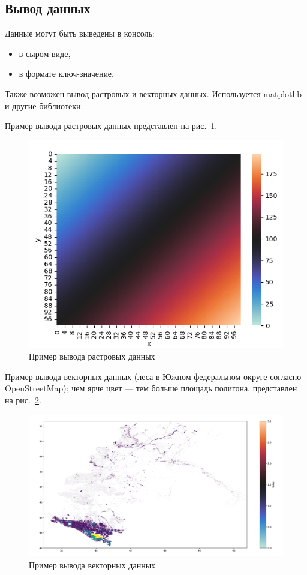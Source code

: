 \documentclass[12pt,a4paper]{scrartcl}
\begin{document}
\subsection{Вывод данных}
\label{sec:desc:opd}

Данные могут быть выведены в консоль:
\begin{itemize}
  \item в сыром виде,
  \item в формате ключ-значение.
\end{itemize}

Также возможен вывод растровых и векторных данных. Используется \href{https://github.com/matplotlib/matplotlib}{matplotlib} и другие библиотеки.

Пример вывода растровых данных представлен на рис.~\ref{fig:wex}.
\begin{figure}[h]
  \centering
  \includegraphics[width=1\textwidth]{raster_distribution.png}
  \caption{Пример вывода растровых данных}\label{fig:wex}
\end{figure}

Пример вывода векторных данных (леса в Южном федеральном округе согласно OpenStreetMap); чем ярче цвет — тем больше площадь полигона, представлен на рис.~\ref{fig:wexx}.
\begin{figure}[h]
  \centering
  \includegraphics[width=1\textwidth]{vector_distribution.png}
  \caption{Пример вывода векторных данных}\label{fig:wexx}
\end{figure}
\end{document}
